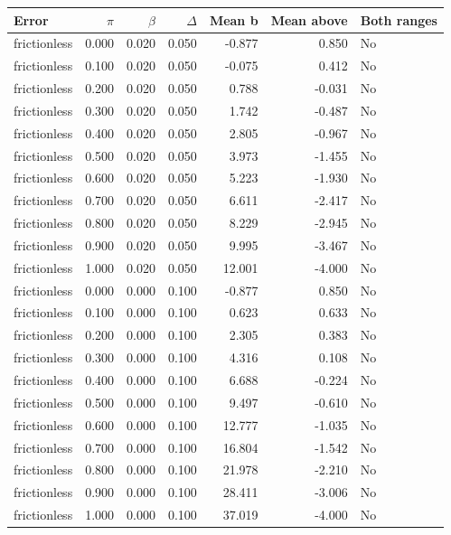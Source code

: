 \begin{tabular}{lrrrrrl}
\toprule
Error & $\pi$ & $\beta$ & $\Delta$ & Mean b & Mean above & Both ranges \\
\midrule
frictionless & 0.000 & 0.020 & 0.050 & -0.877 & 0.850 & No \\
frictionless & 0.100 & 0.020 & 0.050 & -0.075 & 0.412 & No \\
frictionless & 0.200 & 0.020 & 0.050 & 0.788 & -0.031 & No \\
frictionless & 0.300 & 0.020 & 0.050 & 1.742 & -0.487 & No \\
frictionless & 0.400 & 0.020 & 0.050 & 2.805 & -0.967 & No \\
frictionless & 0.500 & 0.020 & 0.050 & 3.973 & -1.455 & No \\
frictionless & 0.600 & 0.020 & 0.050 & 5.223 & -1.930 & No \\
frictionless & 0.700 & 0.020 & 0.050 & 6.611 & -2.417 & No \\
frictionless & 0.800 & 0.020 & 0.050 & 8.229 & -2.945 & No \\
frictionless & 0.900 & 0.020 & 0.050 & 9.995 & -3.467 & No \\
frictionless & 1.000 & 0.020 & 0.050 & 12.001 & -4.000 & No \\
frictionless & 0.000 & 0.000 & 0.100 & -0.877 & 0.850 & No \\
frictionless & 0.100 & 0.000 & 0.100 & 0.623 & 0.633 & No \\
frictionless & 0.200 & 0.000 & 0.100 & 2.305 & 0.383 & No \\
frictionless & 0.300 & 0.000 & 0.100 & 4.316 & 0.108 & No \\
frictionless & 0.400 & 0.000 & 0.100 & 6.688 & -0.224 & No \\
frictionless & 0.500 & 0.000 & 0.100 & 9.497 & -0.610 & No \\
frictionless & 0.600 & 0.000 & 0.100 & 12.777 & -1.035 & No \\
frictionless & 0.700 & 0.000 & 0.100 & 16.804 & -1.542 & No \\
frictionless & 0.800 & 0.000 & 0.100 & 21.978 & -2.210 & No \\
frictionless & 0.900 & 0.000 & 0.100 & 28.411 & -3.006 & No \\
frictionless & 1.000 & 0.000 & 0.100 & 37.019 & -4.000 & No \\
\bottomrule
\end{tabular}
\par\medskip
